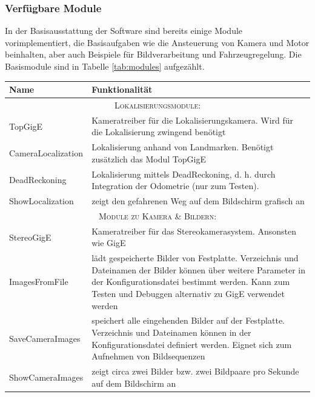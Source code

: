 \documentclass[a4paper, 11pt]{article}
\begin{document}
{\subsubsection{Verfügbare Module}
\label{sec:modules}

In der Basisausstattung der Software sind bereits einige Module vorimplementiert, die Basisaufgaben wie die Ansteuerung von Kamera und Motor beinhalten, aber auch Beispiele für Bildverarbeitung und Fahrzeugregelung. Die Basismodule sind in Tabelle \ref{tab:modules} aufgezählt.

\begin{table}
\centering
\begin{tabular}{p{}p{}}
\hline
Name & Funktionalität \\
\hline\hline
\multicolumn{2}{|c|}{\textsc{Lokalisierungsmodule:}} \\
\hline
TopGigE & \raggedright Kameratreiber für die Lokalisierungskamera. Wird für die Lokalisierung zwingend benötigt \tabularnewline
CameraLocalization & \raggedright Lokalisierung anhand von Landmarken. Benötigt zusätzlich das Modul TopGigE \tabularnewline
DeadReckoning & \raggedright Lokalisierung mittels DeadReckoning, d. h. durch Integration der Odometrie (nur zum Testen). \tabularnewline
ShowLocalization & \raggedright zeigt den gefahrenen Weg auf dem Bildschirm grafisch an \tabularnewline
\hline
\multicolumn{2}{|c|}{\textsc{Module zu Kamera \& Bildern:}} \\
\hline
StereoGigE & \raggedright Kameratreiber für das Stereokamerasystem. Ansonsten wie GigE \tabularnewline
ImagesFromFile & \raggedright lädt gespeicherte Bilder von Festplatte. Verzeichnis und Dateinamen der Bilder können über weitere Parameter in der Konfigurationsdatei bestimmt werden. Kann zum Testen und Debuggen alternativ zu GigE verwendet werden \tabularnewline
SaveCameraImages & \raggedright speichert alle eingehenden Bilder auf der Festplatte. Verzeichnis und Dateinamen können in der Konfigurationsdatei definiert werden. Eignet sich zum Aufnehmen von Bildsequenzen \tabularnewline
ShowCameraImages & \raggedright zeigt circa zwei Bilder bzw. zwei Bildpaare pro Sekunde auf dem Bildschirm an \tabularnewline

\end{tabular}
\end{table}}
\end{document}
